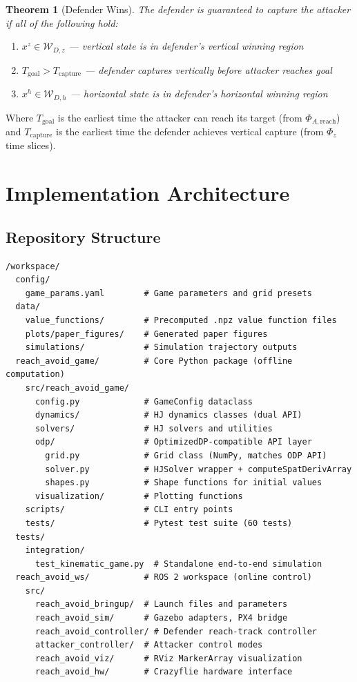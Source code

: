 \documentclass[11pt,a4paper]{article}
\newtheorem{theorem}{Theorem}
\begin{document}
\begin{theorem}[Defender Wins]
The defender is guaranteed to capture the attacker if all of the following hold:
\begin{enumerate}
    \item $x^z \in \mathcal{W}_{D,z}$ --- vertical state is in defender's vertical winning region
    \item $T_\text{goal} > T_\text{capture}$ --- defender captures vertically before attacker reaches goal
    \item $x^h \in \mathcal{W}_{D,h}$ --- horizontal state is in defender's horizontal winning region
\end{enumerate}
\end{theorem}

Where $T_\text{goal}$ is the earliest time the attacker can reach its target (from $\Phi_{A,\text{reach}}$) and $T_\text{capture}$ is the earliest time the defender achieves vertical capture (from $\Phi_z$ time slices).


\section{Implementation Architecture}

\subsection{Repository Structure}

\begin{lstlisting}[style=bashstyle, title=\textbf{Top-Level Directory Layout}]
/workspace/
  config/
    game_params.yaml        # Game parameters and grid presets
  data/
    value_functions/        # Precomputed .npz value function files
    plots/paper_figures/    # Generated paper figures
    simulations/            # Simulation trajectory outputs
  reach_avoid_game/         # Core Python package (offline computation)
    src/reach_avoid_game/
      config.py             # GameConfig dataclass
      dynamics/             # HJ dynamics classes (dual API)
      solvers/              # HJ solvers and utilities
      odp/                  # OptimizedDP-compatible API layer
        grid.py             # Grid class (NumPy, matches ODP API)
        solver.py           # HJSolver wrapper + computeSpatDerivArray
        shapes.py           # Shape functions for initial values
      visualization/        # Plotting functions
    scripts/                # CLI entry points
    tests/                  # Pytest test suite (60 tests)
  tests/
    integration/
      test_kinematic_game.py  # Standalone end-to-end simulation
  reach_avoid_ws/           # ROS 2 workspace (online control)
    src/
      reach_avoid_bringup/  # Launch files and parameters
      reach_avoid_sim/      # Gazebo adapters, PX4 bridge
      reach_avoid_controller/ # Defender reach-track controller
      attacker_controller/  # Attacker control modes
      reach_avoid_viz/      # RViz MarkerArray visualization
      reach_avoid_hw/       # Crazyflie hardware interface
\end{lstlisting}
\end{document}
